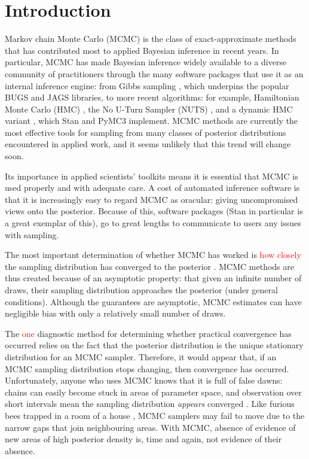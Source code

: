 \documentclass{article}
\begin{document}
\section{Introduction}
Markov chain Monte Carlo (MCMC) is the class of exact-approximate methods that has contributed most to applied Bayesian inference in recent years. In particular, MCMC has made Bayesian inference widely available to a diverse community of practitioners through the many software packages that use it as an internal inference engine: from Gibbs sampling \citep{geman1984stochastic}, which underpins the popular BUGS \citep{lunn2000winbugs} and JAGS \citep{plummer2003jags} libraries, to more recent algorithms: for example, Hamiltonian Monte Carlo (HMC) \citep{neal2011mcmc}, the No U-Turn Sampler (NUTS) \citep{hoffman2014no}, and a dynamic HMC variant \citep{betancourt2017conceptual}, which Stan \citep{carpenter2017stan} and PyMC3 \citep{salvatier2016probabilistic} implement. MCMC methods are currently the most effective tools for sampling from many classes of posterior distributions encountered in applied work, and it seems unlikely that this trend will change soon.

Its importance in applied scientists' toolkits means it is essential that MCMC is used properly and with adequate care. A cost of automated inference software is that it is increasingly easy to regard MCMC as oracular: giving uncompromised views onto the posterior. Because of this, software packages (Stan in particular \citep{carpenter2017stan} is a great exemplar of this), go to great lengths to communicate to users any issues with sampling.

The most important determination of whether MCMC has worked is \textcolor{red}{how closely} the sampling distribution has converged to the posterior \citep{brooks2011handbook}. MCMC methods are thus created because of an asymptotic property: that given an infinite number of draws, their sampling distribution approaches the posterior (under general conditions). Although the guarantees are asymptotic, MCMC estimates can have negligible bias with only a relatively small number of draws.

The \textcolor{red}{one} diagnostic method for determining whether practical convergence has occurred relies on the fact that the posterior distribution is the unique stationary distribution for an MCMC sampler. Therefore, it would appear that, if an MCMC sampling distribution stops changing, then convergence has occurred. Unfortunately, anyone who uses MCMC knows that it is full of false dawns: chains can easily become stuck in areas of parameter space, and observation over short intervals mean the sampling distribution \textit{appears} converged \citep{gelman1992single}. Like furious bees trapped in a room of a house \citep{lambertbees}, MCMC samplers may fail to move due to the narrow gaps that join neighbouring areas. With MCMC, absence of evidence of new areas of high posterior density is, time and again, not evidence of their absence.
\end{document}
